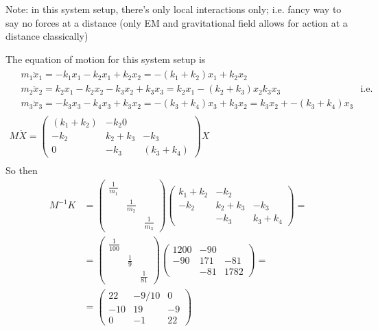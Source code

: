 \documentclass[twoside,10pt]{amsart}
\newcommand{\problemhead}[1]
  {\smallskip
   \noindent{\large\bf Problem #1.}
   \smallskip}
\begin{document}
\problemhead{3.3}  

Note: in this system setup, there's only local interactions only; i.e. fancy way to say no forces at a distance (only EM and gravitational field allows for action at a distance classically)

The equation of motion for this system setup is
\[
\begin{gathered}
\begin{aligned}
  & m_1 \ddot{x}_1 = -k_1 x_1 - k_2 x_1 + k_2 x_2 = -(k_1 + k_2)x_1 + k_2 x_2  \\
  &  m_2 \ddot{x}_2 = k_2x_1 - k_2 x_2 -k_3 x_2 + k_3 x_3 = k_2 x_1 - (k_2 +k_3)x_2 k_3 x_3  \\  
  &  m_3 \ddot{x}_3 = -k_3 x_3 - k_4 x_3 + k_3 x_2 = -(k_3 + k_4)x_3 + k_3 x_2 = k_3 x_2 + - (k_3 +k_4)x_3
\end{aligned}  \text{ i.e. } \\
M\ddot{X} = \left( \begin{matrix} (k_1 +k_2 ) & -k_2 0  \\ -k_2 & k_2 +k_3 & -k_3 \\ 0 & -k_3 & (k_3 +k_4) \end{matrix} \right) X \\
\end{gathered}
\]
So then
\[
\begin{aligned}
  M^{-1} K  & = \left( \begin{matrix} \frac{1}{m_1} & & \\ & \frac{1}{m_2} & \\ & & \frac{1}{m_3} \end{matrix} \right) \left( \begin{matrix} k_1 +k_2 & -k_2 & \\ -k_2 & k_2 + k_3 & -k_3 \\ & -k_3 & k_3 +k_4 \end{matrix} \right) = \\
  & = \left( \begin{matrix} \frac{1}{100} & & \\ & \frac{1}{9} & \\ & & \frac{1}{81} \end{matrix} \right) \left( \begin{matrix} 1200 & -90 & \\ -90 & 171 & -81 \\ & -81 & 1782 \end{matrix} \right) = \\
  & = \left( \begin{matrix} 22 & -9/10 & 0 \\ -10 & 19 & -9 \\ 0 & -1 & 22 \end{matrix} \right)
\end{aligned}
\]
\end{document}
